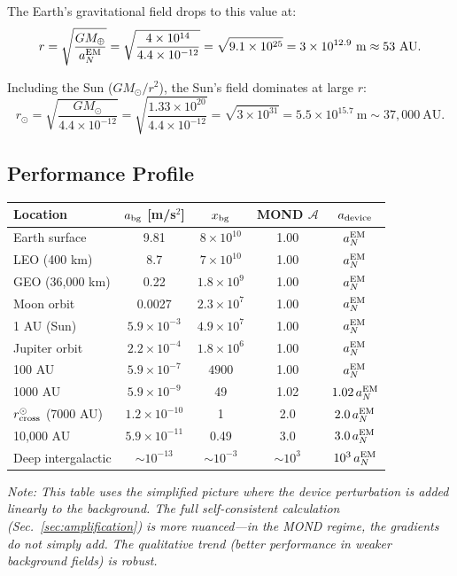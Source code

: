 \documentclass[aps,prd,twocolumn,superscriptaddress,nofootinbib]{revtex4-2}
\newcommand{\ee}[1]{\times 10^{#1}}
\begin{document}
The Earth's gravitational field drops to this value at:
\begin{equation}
r = \sqrt{\frac{GM_\oplus}{a_N^{\rm EM}}} = \sqrt{\frac{4\ee{14}}{4.4\ee{-12}}}
= \sqrt{9.1\ee{25}} = 3\ee{12.9}~\text{m} \approx 53~\text{AU}.
\end{equation}

Including the Sun ($GM_\odot/r^2$), the Sun's field dominates at large $r$:
\begin{equation}
r_\odot = \sqrt{\frac{GM_\odot}{4.4\ee{-12}}} = \sqrt{\frac{1.33\ee{20}}{4.4\ee{-12}}}
= \sqrt{3\ee{31}} = 5.5\ee{15.7}~\text{m} \sim 37{,}000~\text{AU}.
\end{equation}

\subsection{Performance Profile}

\begin{center}
\begin{tabular}{lcccc}
\toprule
Location & $a_{\rm bg}$ [m/s$^2$] & $x_{\rm bg}$ & MOND $\mathcal{A}$ & $a_{\rm device}$ \\
\midrule
Earth surface & 9.81 & $8\ee{10}$ & 1.00 & $a_N^{\rm EM}$ \\
LEO (400 km) & 8.7 & $7\ee{10}$ & 1.00 & $a_N^{\rm EM}$ \\
GEO (36,000 km) & 0.22 & $1.8\ee{9}$ & 1.00 & $a_N^{\rm EM}$ \\
Moon orbit & 0.0027 & $2.3\ee{7}$ & 1.00 & $a_N^{\rm EM}$ \\
1 AU (Sun) & $5.9\ee{-3}$ & $4.9\ee{7}$ & 1.00 & $a_N^{\rm EM}$ \\
Jupiter orbit & $2.2\ee{-4}$ & $1.8\ee{6}$ & 1.00 & $a_N^{\rm EM}$ \\
100 AU & $5.9\ee{-7}$ & $4900$ & 1.00 & $a_N^{\rm EM}$ \\
1000 AU & $5.9\ee{-9}$ & 49 & 1.02 & $1.02\,a_N^{\rm EM}$ \\
$r_{\rm cross}^\odot$ (7000 AU) & $1.2\ee{-10}$ & 1 & 2.0 & $2.0\,a_N^{\rm EM}$ \\
10,000 AU & $5.9\ee{-11}$ & 0.49 & 3.0 & $3.0\,a_N^{\rm EM}$ \\
Deep intergalactic & $\sim 10^{-13}$ & $\sim 10^{-3}$ & $\sim 10^3$ & $10^3\,a_N^{\rm EM}$ \\
\bottomrule
\end{tabular}
\end{center}

\textit{Note: This table uses the simplified picture where the device
perturbation is added linearly to the background.  The full self-consistent
calculation (Sec.~\ref{sec:amplification}) is more nuanced---in the MOND
regime, the gradients do not simply add.  The qualitative trend (better
performance in weaker background fields) is robust.}
\end{document}
